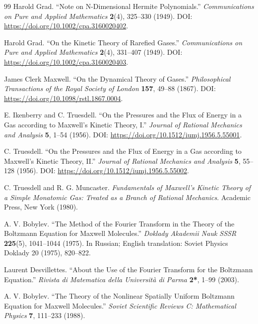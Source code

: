 \documentclass[11pt,oneside]{article}
\numberwithin{equation}{section}
\theoremstyle{definition}
\begin{document}
\begin{thebibliography}{99}
Harold Grad. ``Note on N-Dimensional Hermite Polynomials.'' \emph{Communications on Pure and Applied Mathematics} \textbf{2}(4), 325--330 (1949). DOI: \url{https://doi.org/10.1002/cpa.3160020402}.

Harold Grad. ``On the Kinetic Theory of Rarefied Gases.'' \emph{Communications on Pure and Applied Mathematics} \textbf{2}(4), 331--407 (1949). DOI: \url{https://doi.org/10.1002/cpa.3160020403}.

James Clerk Maxwell. ``On the Dynamical Theory of Gases.'' \emph{Philosophical Transactions of the Royal Society of London} \textbf{157}, 49--88 (1867). DOI: \url{https://doi.org/10.1098/rstl.1867.0004}.

E. Ikenberry and C. Truesdell. ``On the Pressures and the Flux of Energy in a Gas according to Maxwell's Kinetic Theory, I.'' \emph{Journal of Rational Mechanics and Analysis} \textbf{5}, 1--54 (1956). DOI: \url{https://doi.org/10.1512/iumj.1956.5.55001}.

C. Truesdell. ``On the Pressures and the Flux of Energy in a Gas according to Maxwell's Kinetic Theory, II.'' \emph{Journal of Rational Mechanics and Analysis} \textbf{5}, 55--128 (1956). DOI: \url{https://doi.org/10.1512/iumj.1956.5.55002}.

C. Truesdell and R. G. Muncaster. \emph{Fundamentals of Maxwell's Kinetic Theory of a Simple Monatomic Gas: Treated as a Branch of Rational Mechanics}. Academic Press, New York (1980).

A. V. Bobylev. ``The Method of the Fourier Transform in the Theory of the Boltzmann Equation for Maxwell Molecules.'' \emph{Doklady Akademii Nauk SSSR} \textbf{225}(5), 1041--1044 (1975). In Russian; English translation: Soviet Physics Doklady 20 (1975), 820--822.

Laurent Desvillettes. ``About the Use of the Fourier Transform for the Boltzmann Equation.'' \emph{Rivista di Matematica della Universit\`a di Parma} \textbf{2*}, 1--99 (2003).

A. V. Bobylev. ``The Theory of the Nonlinear Spatially Uniform Boltzmann Equation for Maxwell Molecules.'' \emph{Soviet Scientific Reviews C: Mathematical Physics} \textbf{7}, 111--233 (1988).


\end{thebibliography}
\end{document}
